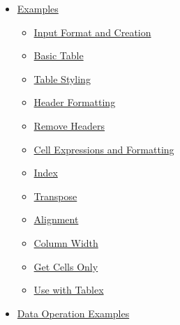 \begin{itemize}
\item
  \href{https://github.com/typst/packages/raw/main/packages/preview/tabut/1.0.2/\#examples}{Examples}

  \begin{itemize}
  \item
    \href{https://github.com/typst/packages/raw/main/packages/preview/tabut/1.0.2/\#input-format-and-creation}{Input
    Format and Creation}
  \item
    \href{https://github.com/typst/packages/raw/main/packages/preview/tabut/1.0.2/\#basic-table}{Basic
    Table}
  \item
    \href{https://github.com/typst/packages/raw/main/packages/preview/tabut/1.0.2/\#table-styling}{Table
    Styling}
  \item
    \href{https://github.com/typst/packages/raw/main/packages/preview/tabut/1.0.2/\#header-formatting}{Header
    Formatting}
  \item
    \href{https://github.com/typst/packages/raw/main/packages/preview/tabut/1.0.2/\#remove-headers}{Remove
    Headers}
  \item
    \href{https://github.com/typst/packages/raw/main/packages/preview/tabut/1.0.2/\#cell-expressions-and-formatting}{Cell
    Expressions and Formatting}
  \item
    \href{https://github.com/typst/packages/raw/main/packages/preview/tabut/1.0.2/\#index}{Index}
  \item
    \href{https://github.com/typst/packages/raw/main/packages/preview/tabut/1.0.2/\#transpose}{Transpose}
  \item
    \href{https://github.com/typst/packages/raw/main/packages/preview/tabut/1.0.2/\#alignment}{Alignment}
  \item
    \href{https://github.com/typst/packages/raw/main/packages/preview/tabut/1.0.2/\#column-width}{Column
    Width}
  \item
    \href{https://github.com/typst/packages/raw/main/packages/preview/tabut/1.0.2/\#get-cells-only}{Get
    Cells Only}
  \item
    \href{https://github.com/typst/packages/raw/main/packages/preview/tabut/1.0.2/\#use-with-tablex}{Use
    with Tablex}
  \end{itemize}
\item
  \href{https://github.com/typst/packages/raw/main/packages/preview/tabut/1.0.2/\#data-operation-examples}{Data
  Operation Examples}


\end{itemize}
